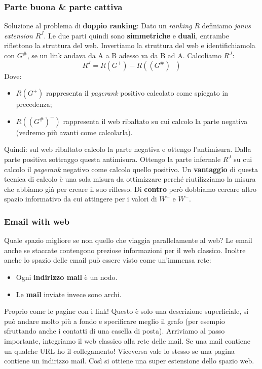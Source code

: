 			\subsubsection{Parte buona \& parte cattiva}
				Soluzione al problema di \textbf{doppio ranking}:
				Dato un \emph{ranking} $R$ definiamo \emph{janus extension} $R^J$. Le due parti quindi sono \textbf{simmetriche} e \textbf{duali}, entrambe riflettono la struttura del web. Invertiamo la struttura del web e identifichiamola con $G^\#$, se un link andava da A a B adesso va da B ad A.
				Calcoliamo $R^J$:
				\[
					R^J = R(G^+) - R((G^\#)^-)
				\]
				Dove:
				\begin{itemize}
					\item $R(G^+)$ rappresenta il \emph{pagerank} positivo calcolato come spiegato in precedenza;
					\item $R((G^\#)^-)$ rappresenta il web ribaltato su cui calcolo la parte negativa (vedremo più avanti come calcolarla).
				\end{itemize}
				Quindi: sul web ribaltato calcolo la parte negativa e ottengo l'antimisura. Dalla parte positiva sottraggo questa antimisura. Ottengo la parte infernale $R^J$ su cui calcolo il \emph{pagerank} negativo come calcolo quello positivo.
				Un \textbf{vantaggio} di questa tecnica di calcolo è una sola misura da ottimizzare perché riutilizziamo la misura che abbiamo già per creare il suo riflesso. Di \textbf{contro} però dobbiamo cercare altro spazio informativo da cui attingere per i valori di $W^+$ e $W^-$.
			
				\subsubsection{Email with web}
				\label{sec:email}
					Quale spazio migliore se non quello che viaggia parallelamente al web? Le email anche se staccate contengono preziose informazioni per il web classico. Inoltre anche lo spazio delle email può essere visto come un'immensa rete:
					\begin{itemize}
						\item Ogni \textbf{indirizzo mail} è un nodo.
						\item Le \textbf{mail} inviate invece sono archi.
					\end{itemize}
					Proprio come le pagine con i link! Questo è solo una descrizione superficiale, si può andare molto più a fondo e specificare meglio il grafo (per esempio sfruttando anche i contatti di una casella di posta).
					Arriviamo al passo importante, integriamo il web classico alla rete delle mail. Se una mail contiene un qualche URL ho il collegamento! Viceversa vale lo stesso se una pagina contiene un indirizzo mail. Così si ottiene una super estensione dello spazio web.
					
